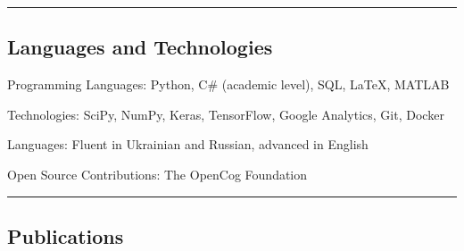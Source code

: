 \documentclass[10pt,letterpaper]{article}
\makeatletter
\newenvironment{indentsection}[1]%
{\begin{list}{}%
	{\setlength{\leftmargin}{#1}}%
	\item[]%
}
{\end{list}}
\newcommand{\headerrow}[2]
{\begin{tabular*}{\linewidth}{l@{\extracolsep{\fill}}r}
	#1 &
	#2 \\
\end{tabular*}}
\makeatother
\begin{document}
%
%	
%

\hrule
\vspace{-0.4em}
\subsection*{Languages and Technologies}

\begin{indentsection}{\parindent}
\begin{description*}
	\item[Programming Languages:]
	Python, C\# (academic level), SQL, \LaTeX, MATLAB
	\item[Technologies:]
	SciPy, NumPy, Keras, TensorFlow, Google Analytics, Git, Docker
	\item[Languages:]
	Fluent in Ukrainian and Russian, advanced in English
	\item[Open Source Contributions:]
	The OpenCog Foundation
\end{description*}
\end{indentsection}

\hrule
\vspace{-0.4em}
\subsection*{Publications}
\end{document}
